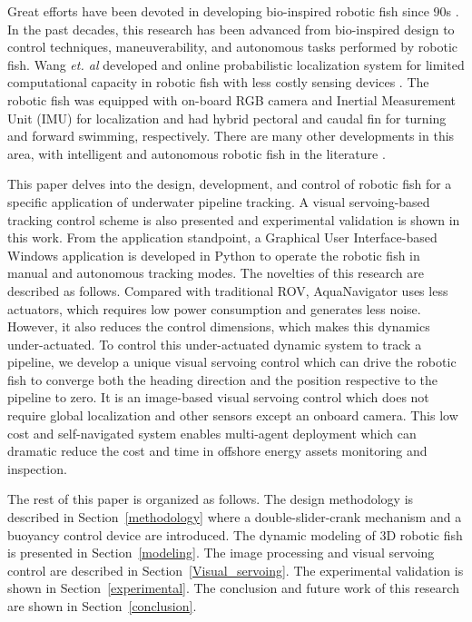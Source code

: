 \documentclass[pdflatex,sn-mathphys-num]{sn-jnl}
\theoremstyle{thmstyleone}%
\begin{document}
Great efforts have been devoted in developing bio-inspired robotic fish since 90s \cite{Shahinpoor1992,mitnews1994}. In the past decades, this research has been advanced from bio-inspired design to control techniques, maneuverability, and autonomous tasks performed by robotic fish\cite{Tan2011}. Wang {\it et. al} developed and online probabilistic localization system for limited computational capacity in robotic fish with less costly sensing devices \cite{Wang2015}. The robotic fish was equipped with on-board RGB camera and Inertial Measurement Unit (IMU) for localization and had hybrid pectoral and caudal fin for turning and forward swimming, respectively. There are many other developments in this area, with intelligent and autonomous robotic fish in the literature \cite{Hu2009,Li2024,Jiang2024}.\par
This paper delves into the design, development, and control of robotic fish for a specific application of underwater pipeline tracking. A visual servoing-based tracking control scheme is also presented and experimental validation is shown in this work. From the application standpoint, a Graphical User Interface-based Windows application is developed in Python to operate the robotic fish in manual and autonomous tracking modes. The novelties of this research are described as follows. Compared with traditional ROV, AquaNavigator uses less actuators, which requires low power consumption and generates less noise. However, it also reduces the control dimensions, which makes this dynamics under-actuated. To control this under-actuated dynamic system to track a pipeline, we develop a unique visual servoing control which can drive the robotic fish to converge both the heading direction and the position respective to the pipeline to zero. It is an image-based visual servoing control which does not require global localization and other sensors except an onboard camera. This low cost and self-navigated system enables multi-agent deployment which can dramatic reduce the cost and time in offshore energy assets monitoring and inspection.\par
The rest of this paper is organized as follows. The design methodology is described in Section~\ref{methodology} where a double-slider-crank mechanism  and a buoyancy control device are introduced. The dynamic modeling of 3D robotic fish is presented in Section~\ref{modeling}. The image processing and visual servoing control are described in Section~\ref{Visual_servoing}. The experimental validation is shown in Section~\ref{experimental}. The conclusion and future work of this research are shown in Section~\ref{conclusion}.
\end{document}
